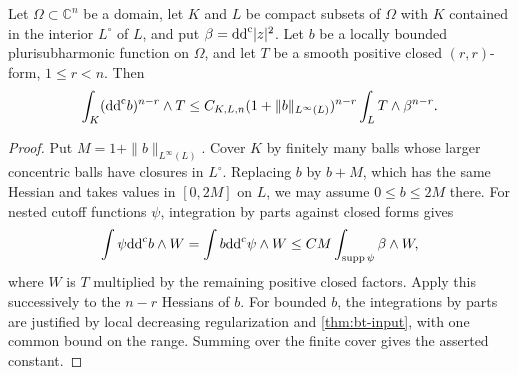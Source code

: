 \begin{lemma}\label{lem:local-mixed-cln-trace}
Let $\Omega\subset\mathbb C^n$ be a domain, let $K$ and $L$ be compact subsets of $\Omega$ with $K$ contained in the interior $L^\circ$ of $L$, and put $\beta=\mathrm{dd}^{\mathrm{c}}|z|^2$. Let $b$ be a locally bounded plurisubharmonic function on $\Omega$, and let $T$ be a smooth positive closed $(r,r)$-form, $1\leq r<n$. Then
\[
 \int_K(\mathrm{dd}^{\mathrm{c}} b)^{n-r}\wedge T
 \leq C_{K,L,n}(1+\|b\|_{L^\infty(L)})^{n-r}
                     \int_L T\wedge\beta^{n-r}.
\]
\end{lemma}
\begin{proof}
Put $M=1+\|b\|_{L^\infty(L)}$. Cover $K$ by finitely many balls whose larger concentric balls have closures in $L^\circ$. Replacing $b$ by $b+M$, which has the same Hessian and takes values in $[0,2M]$ on $L$, we may assume $0\leq b\leq2M$ there. For nested cutoff functions $\psi$, integration by parts against closed forms gives
\[
 \int\psi\mathrm{dd}^{\mathrm{c}} b\wedge W
       =\int b\mathrm{dd}^{\mathrm{c}}\psi\wedge W
       \leq CM
                   \int_{\operatorname{supp}\psi}\beta\wedge W,
\]
where $W$ is $T$ multiplied by the remaining positive closed factors. Apply this successively to the $n-r$ Hessians of $b$. For bounded $b$, the integrations by parts are justified by local decreasing regularization and \cref{thm:bt-input}, with one common bound on the range. Summing over the finite cover gives the asserted constant.
\end{proof}

